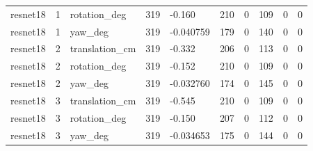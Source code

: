 \begin{table}[t]
{\begin{tabular}{llllllllll}
resnet18 & 1 & rotation\_deg & 319 & -0.160 & 210 & 0 & 109 & 0 & 0 \\
resnet18 & 1 & yaw\_deg & 319 & -0.040759 & 179 & 0 & 140 & 0 & 0 \\
resnet18 & 2 & translation\_cm & 319 & -0.332 & 206 & 0 & 113 & 0 & 0 \\
resnet18 & 2 & rotation\_deg & 319 & -0.152 & 210 & 0 & 109 & 0 & 0 \\
resnet18 & 2 & yaw\_deg & 319 & -0.032760 & 174 & 0 & 145 & 0 & 0 \\
resnet18 & 3 & translation\_cm & 319 & -0.545 & 210 & 0 & 109 & 0 & 0 \\
resnet18 & 3 & rotation\_deg & 319 & -0.150 & 207 & 0 & 112 & 0 & 0 \\
resnet18 & 3 & yaw\_deg & 319 & -0.034653 & 175 & 0 & 144 & 0 & 0 \\
\hline
\end{tabular}}
\end{table}
